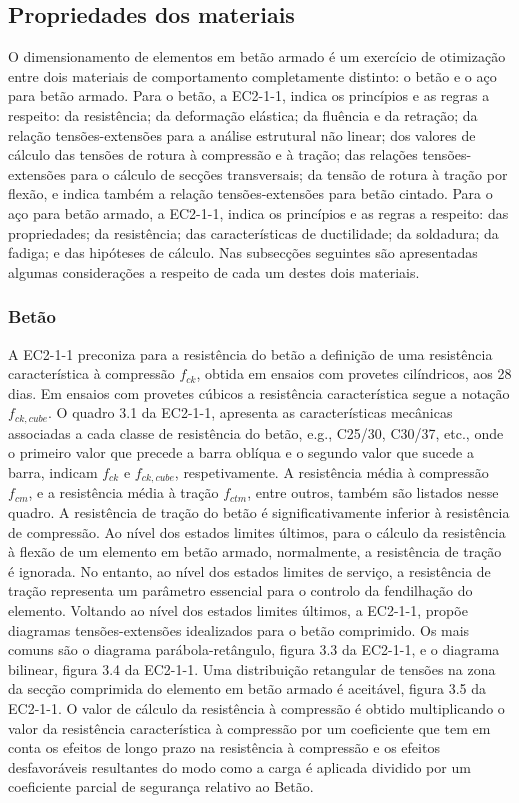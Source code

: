\subsection{Propriedades dos materiais}
O dimensionamento de elementos em betão armado é um exercício de otimização entre dois materiais de comportamento completamente distinto: o betão e o aço para betão armado. Para o betão, a EC2-1-1, indica os princípios e as regras a respeito: da resistência; da deformação elástica; da fluência e da retração; da relação tensões-extensões para a análise estrutural não linear; dos valores de cálculo das tensões de rotura à compressão e à tração; das relações tensões-extensões para o cálculo de secções transversais; da tensão de rotura à tração por flexão, e indica também a relação tensões-extensões para betão cintado. Para o aço para betão armado, a EC2-1-1, indica os princípios e as regras a respeito: das propriedades; da resistência; das características de ductilidade; da soldadura; da fadiga; e das hipóteses de cálculo. Nas subsecções seguintes são apresentadas algumas considerações a respeito de cada um destes dois materiais.

\subsubsection{Betão}
A EC2-1-1 preconiza para a resistência do betão a definição de uma resistência característica à compressão $f_{ck}$, obtida em ensaios com provetes cilíndricos, aos 28 dias. Em ensaios com provetes cúbicos a resistência característica segue a notação $f_{ck,cube}$. O quadro 3.1 da EC2-1-1, apresenta as características mecânicas associadas a cada classe de resistência do betão, e.g., C25/30, C30/37, etc., onde o primeiro valor que precede a barra oblíqua e o segundo valor que sucede a barra, indicam $f_{ck}$ e $f_{ck,cube}$, respetivamente. A resistência média à compressão $f_{cm}$, e a resistência média à tração $f_{ctm}$, entre outros, também são listados nesse quadro.
A resistência de tração do betão é significativamente inferior à resistência de compressão. Ao nível dos estados limites últimos, para o cálculo da resistência à flexão de um elemento em betão armado, normalmente, a resistência de tração é ignorada. No entanto, ao nível dos estados limites de serviço, a resistência de tração representa um parâmetro essencial para o controlo da fendilhação do elemento. Voltando ao nível dos estados limites últimos, a EC2-1-1, propõe diagramas tensões-extensões idealizados para o betão comprimido. Os mais comuns são o diagrama parábola-retângulo, figura 3.3 da EC2-1-1, e o diagrama bilinear, figura 3.4 da EC2-1-1. Uma distribuição retangular de tensões na zona da secção comprimida do elemento em betão armado é aceitável, figura 3.5 da EC2-1-1. O valor de cálculo da resistência à compressão é obtido multiplicando o valor da resistência característica à compressão por um coeficiente que tem em conta os efeitos de longo prazo na resistência à compressão e os efeitos desfavoráveis resultantes do modo como a carga é aplicada dividido por um coeficiente parcial de segurança relativo ao Betão.

